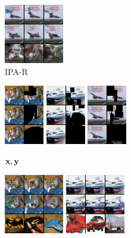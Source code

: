 \begin{figure}[t]
\begin{subfigure}[t]{0.17\textwidth}
      \includegraphics[height=\cifarimgheight]{figs/cigcvae/image-samples/cifar10/freeform_aipo-r_3_samples}
      \caption{IPA-R}
    \end{subfigure}
    \begin{subfigure}[t]{0.11\textwidth}
      \centering
      \includegraphics[height=\cifarimgheight]{figs/cigcvae/image-samples/cifar10/freeform_aipo_0_gt_masked}
      \includegraphics[height=\cifarimgheight]{figs/cigcvae/image-samples/cifar10/freeform_aipo_1_gt_masked}
      \includegraphics[height=\cifarimgheight]{figs/cigcvae/image-samples/cifar10/freeform_aipo_3_gt_masked}
      \caption*{${\mathbf{x}}, {\mathbf{y}}$}
    \end{subfigure}
    \begin{subfigure}[t]{0.17\textwidth}
      \centering
      \includegraphics[height=\cifarimgheight]{figs/cigcvae/image-samples/cifar10/freeform_co_mod_gan_0_samples}
      \includegraphics[height=\cifarimgheight]{figs/cigcvae/image-samples/cifar10/freeform_co_mod_gan_1_samples}

\end{subfigure}
\end{figure}
